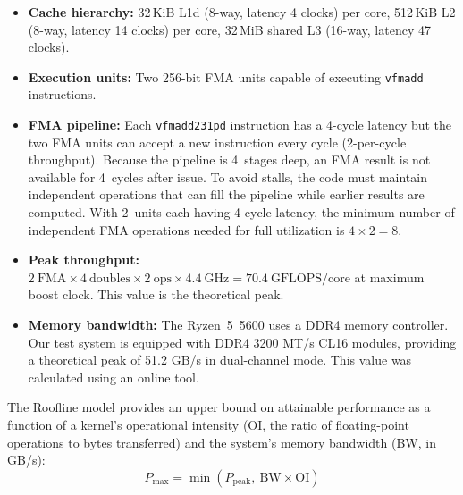 \documentclass[runningheads]{llncs}
\begin{document}
\begin{itemize}
\item \textbf{Cache hierarchy:} 32\,KiB L1d (8-way, latency 4 clocks) per core,
      512\,KiB L2 (8-way, latency 14 clocks) per core, 32\,MiB shared L3 (16-way,
      latency 47 clocks).
\item \textbf{Execution units:} Two 256-bit FMA units capable of
      executing \texttt{vfmadd} instructions.
\item \textbf{FMA pipeline:} Each \texttt{vfmadd231pd} instruction has a
      4-cycle latency but the two FMA units can accept a new instruction every
      cycle (2-per-cycle throughput). Because the pipeline is
      4~stages deep, an FMA result is not available for 4~cycles after issue.
      To avoid stalls, the code must maintain independent operations that can
      fill the pipeline while earlier results are computed. With 2~units each
      having 4-cycle latency, the minimum number of independent FMA operations
      needed for full utilization is $4 \times 2 = 8$.
\item \textbf{Peak throughput:}
      $2\ \text{FMA} \times 4\ \text{doubles} \times 2\ \text{ops} \times
      4.4\ \text{GHz} = 70.4\ \text{GFLOPS/core}$ at maximum boost clock.
      This value is the theoretical peak.
\item \textbf{Memory bandwidth:} The Ryzen~5~5600 uses a DDR4 memory controller.
      Our test system is equipped with DDR4 3200 MT/s CL16 modules, 
      providing a theoretical peak of 51.2 GB/s in dual-channel mode. 
      This value was calculated using an online tool.\cite{ramcalc}
\end{itemize}

The Roofline model\cite{roofline} provides an upper bound on attainable
performance as a function of a kernel's operational intensity (OI, the ratio of
floating-point operations to bytes transferred) and the system's memory bandwidth
(BW, in GB/s):
\begin{equation}
P_{\max} = \min(P_{\text{peak}},\ \text{BW} \times \text{OI})
\label{eq:roofline}
\end{equation}
\end{document}
